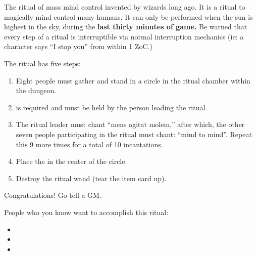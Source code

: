 \documentclass[green]{guildcamp2}
\begin{document}
\name{\gEnslaveRitual{}}
The ritual of mass mind control invented by wizards long ago. It is a ritual to magically mind control many humans. It can only be performed when the sun is highest in the sky, during the {\bf last thirty minutes of game.} Be warned that every step of a ritual is interruptible via normal interruption mechanics (ie: a character says ``I stop you'' from within 1 ZoC.)

The ritual has five steps: 

\begin{enumerate}
\item Eight people must gather and stand in a circle in the ritual chamber within the dungeon.
\item \iRitualWand{} is required and must be held by the person leading the ritual.
\item The ritual leader must chant ``mens agitat molem,'' after which, the other seven people participating in the ritual must chant: ``mind to mind''. Repeat this 9 more times for a total of 10 incantations.
\item Place the \iDominationIdol{} in the center of the circle.
\item Destroy the ritual wand (tear the item card up).
\end{enumerate}

Congratulations! Go tell a GM.



People who you know want to accomplish this ritual:
\begin{itemize}
\item \cVampire{}
\item \cBasilisk{}
\item \cMinotaur{}
\end{itemize}
\end{document}
